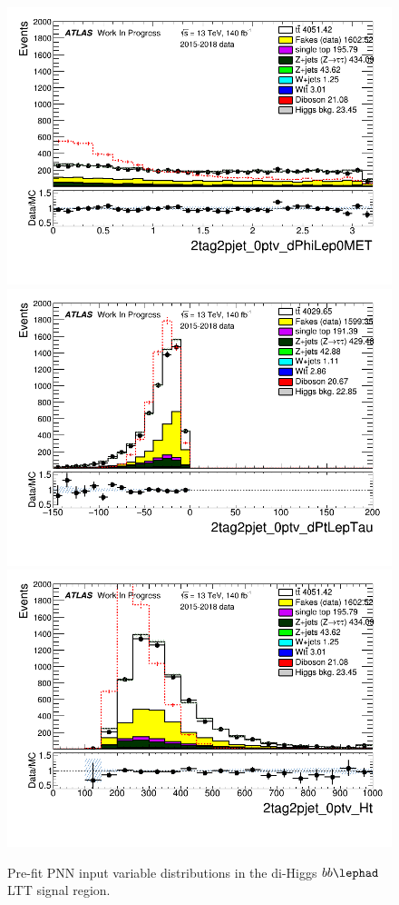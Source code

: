 \begin{figure}
\includegraphics[width=.45\textwidth]{figures/mva/HH/LepHad/LTT/2tag2pjet_0ptv_dPhiLep0MET_SR_ALLFAKES_LTT_ALL_NR_TRBins.png}\\
\includegraphics[width=.45\textwidth]{figures/mva/HH/LepHad/LTT/2tag2pjet_0ptv_dPtLepTau_SR_ALLFAKES_LTT_ALL_NR_TRBins.png}
\includegraphics[width=.45\textwidth]{figures/mva/HH/LepHad/LTT/2tag2pjet_0ptv_Ht_SR_ALLFAKES_LTT_ALL_NR_TRBins.png}
\caption{Pre-fit PNN input variable distributions in the di-Higgs $bb\lephad$ LTT signal region.}
\label{fig:lephadmvainputsltt}
\end{figure}
\fi

